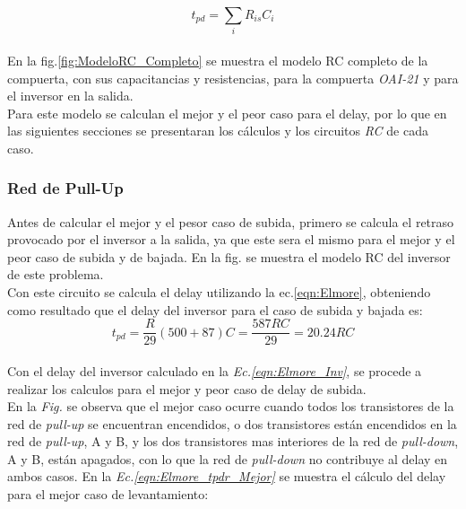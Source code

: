 \documentclass[12pt,a4paper]{article} %
\begin{document}
\begin{equation}\label{eqn:Elmore}
t_{pd} = \sum_{i} R_{is}C_{i}
\end{equation}\\


En la fig.\ref{fig:ModeloRC_Completo} se muestra el modelo RC completo de la compuerta, con sus capacitancias y resistencias, para la compuerta \textit{OAI-21} y para el inversor en la salida.\\


Para este modelo se calculan el mejor y el peor caso para el delay, por lo que en las siguientes secciones se presentaran los cálculos y los circuitos \textit{RC} de cada caso.\\

\subsubsection{Red de Pull-Up}

Antes de calcular el mejor y el pesor caso de subida, primero se calcula el retraso provocado por el inversor a la salida, ya que este sera el mismo para el mejor y el peor caso de subida y de bajada. En la fig. se muestra el modelo RC del inversor de este problema.\\


Con este circuito se calcula el delay utilizando la ec.\ref{eqn:Elmore}, obteniendo como resultado que el delay del inversor para el caso de subida y bajada es:\\

\begin{equation}\label{eqn:Elmore_Inv}
t_{pd} = \frac{R}{29}(500 + 87)C = \frac{587RC}{29} = 20.24RC
\end{equation}\\

Con el delay del inversor calculado en la \textit{Ec.\ref{eqn:Elmore_Inv}}, se procede a realizar los calculos para el mejor y peor caso de delay de subida.\\

En la \textit{Fig.} se observa que el mejor caso ocurre cuando todos los transistores de la red de \textit{pull-up} se encuentran encendidos, o dos transistores están encendidos en la red de \textit{pull-up}, A y B, y los dos transistores mas interiores de la red de \textit{pull-down}, A y B, están apagados, con lo que la red de \textit{pull-down} no contribuye al delay en ambos casos. En la \textit{Ec.\ref{eqn:Elmore_tpdr_Mejor}} se muestra el cálculo del delay para el mejor caso de levantamiento:\\
\end{document}
